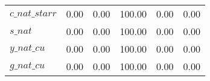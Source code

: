 \begin{center}
\begin{longtable}{lccccc}
$c\_nat\_starr  $	 & 	                0.00	 & 	                0.00	 & 	              100.00	 & 	                0.00	 & 	                0.00 \\ 
$s\_nat         $	 & 	                0.00	 & 	                0.00	 & 	              100.00	 & 	                0.00	 & 	                0.00 \\ 
$y\_nat\_cu     $	 & 	                0.00	 & 	                0.00	 & 	              100.00	 & 	                0.00	 & 	                0.00 \\ 
$g\_nat\_cu     $	 & 	                0.00	 & 	                0.00	 & 	              100.00	 & 	                0.00	 & 	                0.00 \\ 
\end{longtable}
 \end{center}
